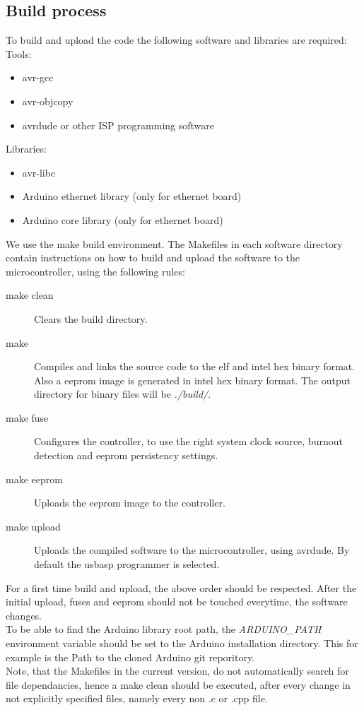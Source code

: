 \documentclass[a4paper]{scrreprt}
\begin{document}
\subsection{Build process}
To build and upload the code the following software and libraries are required:\\
Tools:
\begin{itemize}
  \item avr-gcc
  \item avr-objcopy
  \item avrdude or other ISP programming software
\end{itemize}
Libraries:
\begin{itemize}
  \item avr-libc
  \item Arduino ethernet library (only for ethernet board)
  \item Arduino core library (only for ethernet board)
\end{itemize}
We use the make build environment. The Makefiles in each software directory contain instructions on how to build and upload the software to the microcontroller, using the following rules:
\begin{description}
  \item[make clean] Clears the build directory.
  \item[make] Compiles and links the source code to the elf and intel hex binary format. Also a eeprom image is generated in intel hex binary format. The output directory for binary files will be \emph{./build/}.
  \item[make fuse] Configures the controller, to use the right system clock source, burnout detection and eeprom persistency settings.
  \item[make eeprom] Uploads the eeprom image to the controller.
  \item[make upload] Uploads the compiled software to the microcontroller, using avrdude. By default the usbasp programmer is selected.
\end{description}
For a first time build and upload, the above order should be respected. After the initial upload, fuses and eeprom should not be touched everytime, the software changes.\\
To be able to find the Arduino library root path, the \emph{ARDUINO\_PATH} environment variable should be set to the Arduino installation directory. This for example is the Path to the cloned Arduino git reporitory.\\
Note, that the Makefiles in the current version, do not automatically search for file dependancies, hence a make clean should be executed, after every change in not explicitly specified files, namely every non .c or .cpp file.
\end{document}
